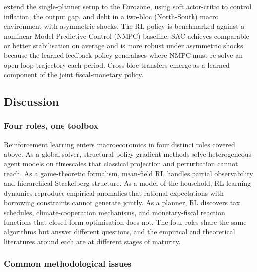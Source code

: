 \citet{Khundadze2025} extend the single-planner setup to the Eurozone,
using soft actor-critic to control inflation, the output gap, and
debt in a two-bloc (North-South) macro environment with asymmetric
shocks. The RL policy is benchmarked against a nonlinear Model
Predictive Control (NMPC) baseline. SAC achieves comparable or better
stabilisation on average and is more robust under asymmetric shocks
because the learned feedback policy generalises where NMPC must
re-solve an open-loop trajectory each period. Cross-bloc transfers
emerge as a learned component of the joint fiscal-monetary policy.

\subsection{Discussion}
\label{sec:macro:discussion}

\subsubsection{Four roles, one toolbox}

Reinforcement learning enters macroeconomics in four distinct roles
covered above. As a global solver, structural policy gradient methods
solve heterogeneous-agent models on timescales that classical
projection and perturbation cannot reach. As a game-theoretic
formalism, mean-field RL handles partial observability and
hierarchical Stackelberg structure. As a model of the household,
RL learning dynamics reproduce empirical anomalies that rational
expectations with borrowing constraints cannot generate jointly.
As a planner, RL discovers tax schedules, climate-cooperation
mechanisms, and monetary-fiscal reaction functions that closed-form
optimisation does not. The four roles share the same algorithms but answer different questions, and the empirical and theoretical
literatures around each are at different stages of maturity.

\subsubsection{Common methodological issues}
\label{sec:macro:common_issues}

